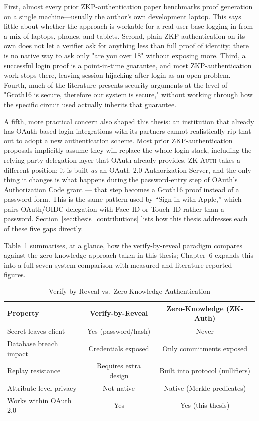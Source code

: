 \documentclass[12pt,a4paper,oneside]{report}
\begin{document}
First, almost every prior ZKP-authentication paper benchmarks proof
generation on a single machine---usually the author's own development
laptop. This says little about whether the approach is workable for a
real user base logging in from a mix of laptops, phones, and tablets.
Second, plain ZKP authentication on its own does not let a verifier ask
for anything less than full proof of identity; there is no native way to
ask only "are you over 18" without exposing more. Third, a successful
login proof is a point-in-time guarantee, and most ZKP-authentication
work stops there, leaving session hijacking after login as an open
problem. Fourth, much of the literature presents security arguments at
the level of "Groth16 is secure, therefore our system is secure," without
working through how the specific circuit used actually inherits that
guarantee.

A fifth, more practical concern also shaped this thesis: an institution
that already has OAuth-based login integrations with its partners cannot
realistically rip that out to adopt a new authentication scheme. Most
prior ZKP-authentication proposals implicitly assume they will replace
the whole login stack, including the relying-party delegation layer that
OAuth already provides. \textsc{ZK-Auth} takes a different position: it
is built \textit{as} an OAuth~2.0 Authorization Server, and the only
thing it changes is what happens during the password-entry step of
OAuth's Authorization Code grant --- that step becomes a Groth16 proof
instead of a password form. This is the same pattern used by
``Sign in with Apple,'' which pairs OAuth/OIDC delegation with Face~ID or
Touch~ID rather than a password. Section~\ref{sec:thesis_contributions}
lists how this thesis addresses each of these five gaps directly.

Table~\ref{tab:auth_paradigm_compare} summarises, at a glance, how the
verify-by-reveal paradigm compares against the zero-knowledge approach
taken in this thesis; Chapter~6 expands this into a full seven-system
comparison with measured and literature-reported figures.

\begin{table}[htbp]
\renewcommand{\arraystretch}{1.2}
\caption{Verify-by-Reveal vs.\ Zero-Knowledge Authentication}
\label{tab:auth_paradigm_compare}
\centering
\begin{tabular}{lcc}
\toprule
\textbf{Property} & \textbf{Verify-by-Reveal} & \textbf{Zero-Knowledge (ZK-Auth)} \\
\midrule
Secret leaves client      & Yes (password/hash) & Never \\
Database breach impact    & Credentials exposed  & Only commitments exposed \\
Replay resistance         & Requires extra design & Built into protocol (nullifiers) \\
Attribute-level privacy   & Not native            & Native (Merkle predicates) \\
Works within OAuth 2.0    & Yes                   & Yes (this thesis) \\
\bottomrule
\end{tabular}
\end{table}
\end{document}
